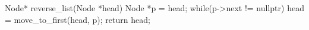 \begin{parts}
    \begin{solution}
        \begin{cpp}
            Node* reverse_list(Node *head){
                Node *p = head;
                while(p->next != nullptr){
                    head = move_to_first(head, p);
                }
                return head;
            }
        \end{cpp}
    \end{solution}
    

    
\end{parts}
